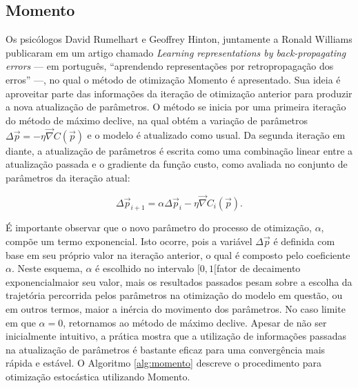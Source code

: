     \subsection{Momento} \label{s:momento}

      Os psicólogos David Rumelhart e Geoffrey Hinton, juntamente a Ronald Williams publicaram em  um artigo chamado \textit{Learning representations by back-propagating errors} --- em português, ``aprendendo representações por retropropagação dos erros'' ---, no qual o método de otimização Momento é apresentado. Sua ideia é aproveitar parte das informações da iteração de otimização anterior para produzir a nova atualização de parâmetros. O método se inicia por uma primeira iteração do método de máximo declive, na qual obtém a variação de parâmetros $\Delta \vec{p} = -\eta \vec{\nabla} C(\vec{p})$ e o modelo é atualizado como usual. Da segunda iteração em diante, a atualização de parâmetros é escrita como uma combinação linear entre a atualização passada e o gradiente da função custo, como avaliada no conjunto de parâmetros da iteração atual:

      \begin{equation} \label{e:atualizacao_momento}
        \Delta \vec{p}_{i+1} = \alpha \Delta\vec{p}_i - \eta \vec{\nabla} C_i(\vec{p})
        .
      \end{equation}

    É importante observar que o novo parâmetro do processo de otimização, $\alpha$, compõe um termo exponencial. Isto ocorre, pois a variável $\Delta \vec{p}$ é definida com base em seu próprio valor na iteração anterior, o qual é composto pelo coeficiente $\alpha$. Neste esquema, $\alpha$ é escolhido no intervalo $[0,1[$\DIFdelbegin {}\DIFdelend \DIFaddbegin {}\DIFaddend fator de decaimento exponencial\DIFdelbegin {}\DIFdelend \DIFaddbegin {}\DIFaddend maior seu valor, mais os resultados passados pesam sobre a escolha da trajetória percorrida pelos parâmetros na otimização do modelo em questão, ou em outros termos, maior a inércia do movimento dos parâmetros. No caso limite em que $\alpha = 0$, retornamos ao método de máximo declive. Apesar de não ser inicialmente intuitivo, a prática mostra que a utilização de informações passadas na atualização de parâmetros é bastante eficaz para uma convergência mais rápida e estável. O Algoritmo \ref{alg:momento} descreve o procedimento para otimização estocástica utilizando Momento.

